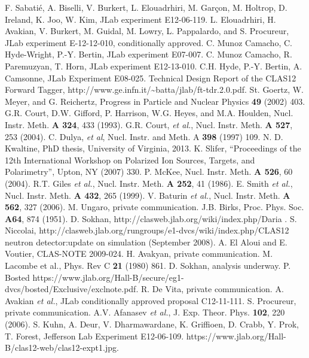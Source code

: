 \documentclass[12pt]{report}
\begin{document}
\begin{thebibliography}{999}
 F. Sabati\'e, A. Biselli, V. Burkert, L. Elouadrhiri, M. Gar\c{c}on, M. Holtrop, D. Ireland, K. Joo, W. Kim, JLab experiment E12-06-119.
  L. Elouadrhiri, H. Avakian, V. Burkert, M. Guidal, M. Lowry, L. Pappalardo, and S. Procureur, JLab experiment E-12-12-010, conditionally approved.
 C. Munoz Camacho, C. Hyde-Wright, P.-Y. Bertin, JLab experiment E07-007.
 C. Munoz Camacho, R. Paremuzyan, T. Horn, JLab experiment E12-13-010. 
 C.H. Hyde, P.-Y. Bertin, A. Camsonne, JLab Experiment E08-025.
 Technical Design Report of the CLAS12 Forward Tagger, {\rm http://www.ge.infn.it/\textasciitilde batta/jlab/ft-tdr.2.0.pdf}.
 St. Goertz, W. Meyer, and G. Reichertz, Progress in Particle and Nuclear Physics {\bf 49} (2002) 403.
 G.R. Court, D.W. Gifford, P. Harrison, W.G. Heyes, and M.A. Houlden, Nucl. Instr. Meth. {\bf A 324}, 433 (1993). 
 G.R. Court, {\it et al.}, Nucl. Instr. Meth. {\bf A 527}, 253 (2004).
  C. Dulya, {\it et al}, Nucl. Instr. and Meth. A \textbf{398} (1997) 109.
 N. D. Kwaltine, PhD thesis, University of Virginia, 2013.
 K. Slifer, ``Proceedings of the 12th International Workshop on Polarized Ion Sources, Targets, and Polarimetry'', Upton, NY (2007) 330.
 P. McKee, Nucl. Instr. Meth. {\bf A 526}, 60 (2004).
 R.T. Giles {\it et al.}, Nucl. Instr. Meth. {\bf A 252}, 41 (1986).
 E. Smith {\it et al.}, Nucl. Instr. Meth. {\bf A 432}, 265 (1999).
 V. Baturin {\it et al.}, Nucl. Instr. Meth. {\bf A 562}, 327 (2006).
 M. Ungaro, private communication.
 J.B. Birks, Proc. Phys. Soc. {\bf A64}, 874 (1951).
 D. Sokhan, http://clasweb.jlab.org/wiki/index.php/Daria .
 S. Niccolai, {\rm http://clasweb.jlab.org/rungroups/e1-dvcs/wiki/index.php/CLAS12 neutron detector:update on simulation (September 2008)}.
 A. El Aloui and E. Voutier, CLAS-NOTE 2009-024.
 H. Avakyan, private communication.
 M. Lacombe et al., Phys. Rev C {\bf 21} (1980) 861.
 D. Sokhan, analysis underway. 
 P. Bosted {\rm https://www.jlab.org/Hall-B/secure/eg1-dvcs/bosted/Exclusive/exclnote.pdf}.
  R. De Vita, private communication.
 A. Avakian {\it et al.}, JLab conditionally approved proposal C12-11-111. 
 S. Procureur, private communication.  
 A.V. Afanasev {\it et al.}, J. Exp. Theor. Phys. {\bf 102}, 220 (2006).
 S. Kuhn, A. Deur, V. Dharmawardane, K. Griffioen, D. Crabb, Y. Prok, T. Forest, Jefferson Lab Experiment E12-06-109.
 {\rm https://www.jlab.org/Hall-B/clas12-web/clas12-expt1.jpg}.

\end{thebibliography}


%
\end{document}
